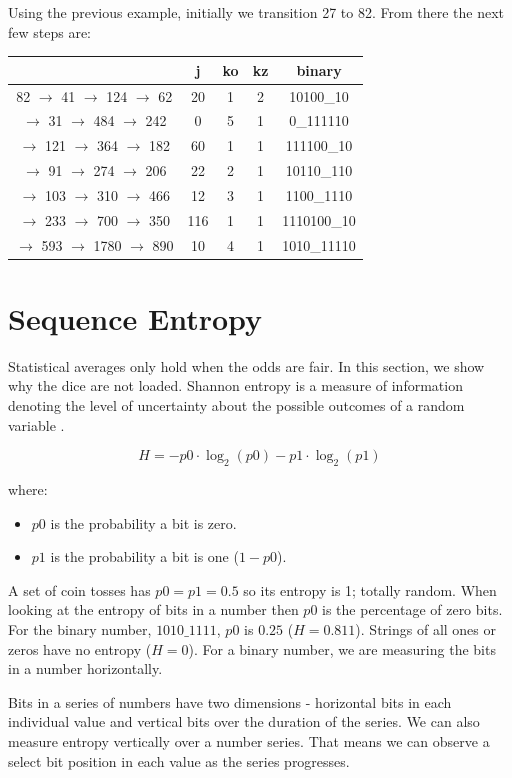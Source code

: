 \documentclass[letterpaper]{article}
\begin{document}
\begin{multicols}{2}
Using the previous example, initially we transition 27 to 82. From there the next few steps are:

\begin{center}
\begin{tabular}{|c|c|c|c|c|}
\hline
& \textbf{j} & \textbf{ko} & \textbf{kz}& \textbf{binary} \\ 
\hline
82 $\to$ 41  $\to$  124 $\to$ 62&20&1&2&10100\_10 \\ 
\hline
$\to$ 31  $\to$  484 $\to$ 242&0&5&1&0\_111110 \\ 
\hline
$\to$ 121 $\to$  364 $\to$ 182&60&1&1&111100\_10 \\ 
\hline
$\to$  91 $\to$  274 $\to$ 206&22&2&1&10110\_110 \\ 
\hline
$\to$ 103 $\to$  310 $\to$ 466&12&3&1&1100\_1110 \\ 
\hline
$\to$ 233 $\to$  700 $\to$ 350&116&1&1&1110100\_10 \\ 
\hline
$\to$ 593 $\to$ 1780 $\to$ 890&10&4&1&1010\_11110 \\ 
\hline
\end{tabular}
\end{center}

\section{Sequence Entropy}

Statistical averages only hold when the odds are fair. In this section, we show why the dice are not loaded. Shannon entropy is a measure of information denoting the level of uncertainty about the possible outcomes of a random variable \cite{1}.

\[
H = -p0 \cdot \log_2(p0) - p1 \cdot \log_2(p1)
\]

where:
\begin{itemize}
    \item $p0$ is the probability a bit is zero.
    \item $p1$ is the probability a bit is one ($1 - p0$).
\end{itemize}

A set of coin tosses has $p0 = p1 = 0.5$ so its entropy is 1; totally random. When looking at the entropy of bits in a number then $p0$ is the percentage of zero bits. For the binary number, $1010\_1111$, $p0$ is $0.25$ ($H = 0.811$). Strings of all ones or zeros have no entropy ($H = 0$). For a binary number, we are measuring the bits in a number horizontally.

Bits in a series of numbers have two dimensions - horizontal bits in each individual value and vertical bits over the duration of the series. We can also measure entropy vertically over a number series. That means we can observe a select bit position in each value as the series progresses.


\end{multicols}
\end{document}
